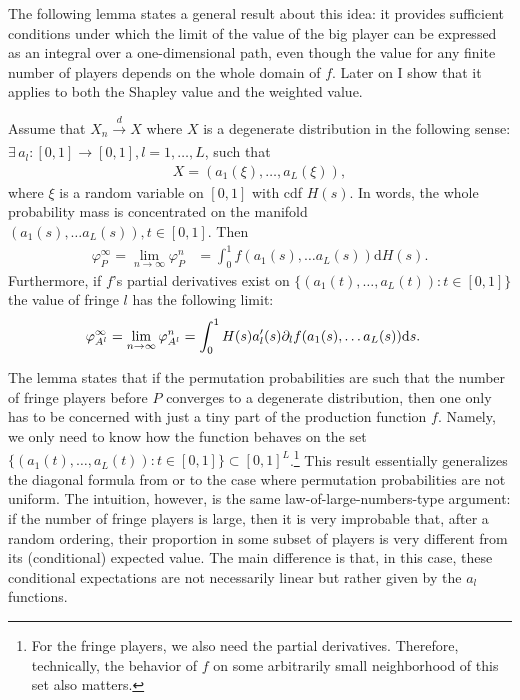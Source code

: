 The following lemma states a general result about this idea: it provides sufficient conditions under which the limit of the value of the big player can be expressed as an integral over a one-dimensional path, even though the value for any finite number of players depends on the whole domain of $f$.
Later on I show that it applies to both the Shapley value and the weighted value.
\begin{lemma}
    \label{lem:many_sided_manifold}
    Assume that $X_n \xrightarrow[]{d} X$ where $X$ is a degenerate distribution in the following sense: $\exists \, a_l: [0, 1] \to [0, 1], l = 1, \dots, L$, such that
    \begin{align*}
        X = (a_1(\xi), \dots, a_L(\xi)),
    \end{align*}
    where $\xi$ is a random variable on $[0, 1]$ with cdf $H(s)$.
    In words, the whole probability mass is concentrated on the manifold $(a_1(s), \dots a_L(s)), t \in [0, 1]$.
    Then
    \begin{align*}
        \varphi_P^\infty = \lim_{n \to \infty} \varphi_P^n &= \int_0^1 f(a_1(s), \dots a_L(s)) \mathrm{d}H(s).
    \end{align*}
    Furthermore, if $f$'s partial derivatives exist on $\{(a_1(t), \dots, a_L(t)) : t \in [0, 1]\}$ the value of fringe $l$ has the following limit:
    \begin{align*}
        \varphi_{A^l}^\infty = \lim_{n \to \infty} \varphi_{A^l}^n &= \int_0^1 H(s) a_l'(s) \partial_l f(a_1(s), \dots a_L(s)) \mathrm{d}s.
    \end{align*}
\end{lemma}

The lemma states that if the permutation probabilities are such that the number of fringe players before $P$ converges to a degenerate distribution, then one only has to be concerned with just a tiny part of the production function $f$.
Namely, we only need to know how the function behaves on the set $\{(a_1(t), \dots, a_L(t)) : t \in [0, 1]\} \subset [0, 1]^L$.\footnote{
    For the fringe players, we also need the partial derivatives.
    Therefore, technically, the behavior of $f$ on some arbitrarily small neighborhood of this set also matters.
}
This result essentially generalizes the diagonal formula from \textcite{aumann2015values} or \textcite{stole1996intra} to the case where permutation probabilities are not uniform.
The intuition, however, is the same law-of-large-numbers-type argument: if the number of fringe players is large, then it is very improbable that, after a random ordering, their proportion in some subset of players is very different from its (conditional) expected value.
The main difference is that, in this case, these conditional expectations are not necessarily linear but rather given by the $a_l$ functions.

